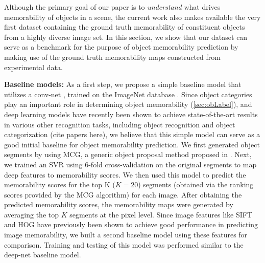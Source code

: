Although the primary goal of our paper is to \textit{understand} what drives memorability of objects in a scene, the current work also makes available the very first dataset containing the ground truth memorability of constituent objects from a highly diverse image set. In this section, we show that our dataset can serve as a  benchmark for the purpose of object memorability prediction by making use of the ground truth memorability maps constructed from experimental data.

\textbf{Baseline models:} As a first step, we propose a simple baseline model that utilizes a conv-net \cite{krizhevsky12}, \cite{jia14} trained on the ImageNet database \cite{deng09}. Since object categories play an important role in determining object memorability (\ref{sec:obLabel}), and deep learning models have recently been shown to achieve state-of-the-art results in various other recognition tasks, including object recognition and object categorization (cite papers here), we believe that this simple model can serve as a good initial baseline for object memorability prediction. We first generated object segments by using MCG, a generic object proposal method proposed in \cite{arbelaez14}. Next, we trained an SVR using $6$-fold cross-validation on the original segments to map deep features to memorability scores. We then used this model to predict the memorability scores for the top K ($K=20$) segments (obtained via the ranking scores provided by the MCG algorithm) for each image. After obtaining the predicted memorability scores, the memorability maps were generated by averaging the top $K$ segments at the pixel level. Since image features like SIFT \cite{lowe04} and HOG \cite{dalal05} have previously been shown to achieve good performance in predicting image memorability, we built a second baseline model using these features for comparison. Training and testing of this model was performed similar to the deep-net baseline model.

